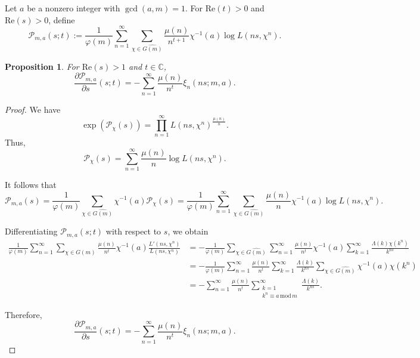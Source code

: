 \documentclass[12pt]{amsart}
\newtheorem{proposition}[theorem]{Proposition}
\newcommand{\pt}{\partial}
\begin{document}
Let $a$ be a nonzero integer with $\gcd(a, m) = 1$. For $\mathrm{Re}(t) > 0$ and $\mathrm{Re}(s) > 0$, define
\begin{equation*}
\mathcal{P}_{m,a}(s; t) := \frac{1}{\varphi(m)} \sum_{n=1}^\infty \sum_{\chi \in \widehat{G(m)}} \frac{\mu(n)}{n^{t+1}} \chi^{-1}(a) \log L(ns, \chi^n).
\end{equation*}



\begin{proposition}



For $\mathrm{Re}(s) > 1$ and $t \in \mathbb{C}$,
\begin{equation*}
\frac{\pt \mathcal{P}_{m,a}}{\pt s}(s; t) = -\sum_{n=1}^\infty \frac{\mu(n)}{n^t} \xi_n(ns; m, a).
\end{equation*}
\end{proposition}

\begin{proof}

We have
\begin{equation*}
\exp(\mathcal{P}_\chi(s)) = \prod_{n=1}^\infty L(ns,\chi^n)^{\frac{\mu(n)}{n}}.
\end{equation*}
Thus,
\begin{equation*}
\mathcal{P}_\chi(s) = \sum_{n=1}^\infty \frac{\mu(n)}{n} \log L(ns,\chi^n).
\end{equation*}


It follows that
\begin{equation*}
\mathcal{P}_{m,a}(s) = \frac{1}{\varphi(m)} \sum_{\chi \in \widehat{G(m)}} \chi^{-1}(a) \mathcal{P}_\chi(s)
= \frac{1}{\varphi(m)} \sum_{n=1}^\infty \sum_{\chi \in \widehat{G(m)}} \frac{\mu(n)}{n} \chi^{-1}(a) \log L(ns,\chi^n).
\end{equation*}


Differentiating $\mathcal{P}_{m,a}(s; t)$ with respect to $s$, we obtain
\begin{align*}
\frac{1}{\varphi(m)} \sum_{n=1}^\infty \sum_{\chi \in \widehat{G(m)}} \frac{\mu(n)}{n^{t}} \chi^{-1}(a) \frac{L'(ns,\chi^n)}{L(ns,\chi^n)}
&= -\frac{1}{\varphi(m)} \sum_{\chi \in \widehat{G(m)}} \sum_{n=1}^\infty \frac{\mu(n)}{n^{t}} \chi^{-1}(a) \sum_{k=1}^\infty \frac{\Lambda(k) \chi(k^n)}{k^{ns}} \\
&= -\frac{1}{\varphi(m)} \sum_{n=1}^\infty \frac{\mu(n)}{n^t} \sum_{k=1}^\infty \frac{\Lambda(k)}{k^{ns}} \sum_{\chi \in \widehat{G(m)}} \chi^{-1}(a) \chi(k^n) \\
&= -\sum_{n=1}^\infty \frac{\mu(n)}{n^t} \sum_{\substack{k=1 \\ k^n \equiv a\, \mathrm{mod}\, m}}^\infty \frac{\Lambda(k)}{k^{ns}}.
\end{align*}


Therefore,
\[
\frac{\pt \mathcal{P}_{m,a}}{\pt s}(s; t) = -\sum_{n=1}^\infty \frac{\mu(n)}{n^t} \xi_n(ns; m, a).
\]

\end{proof}
\end{document}
